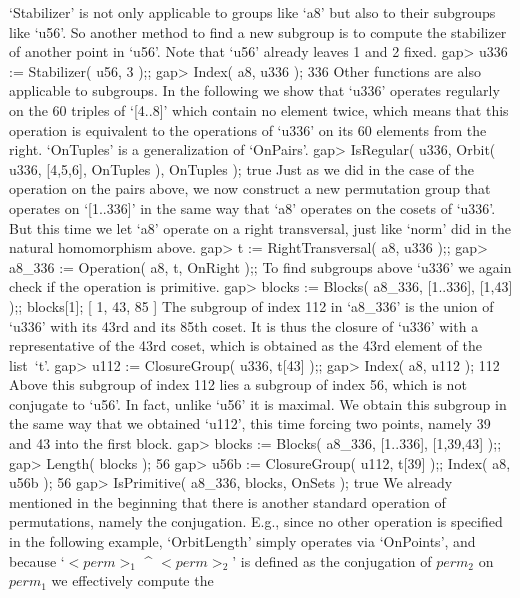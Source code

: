 `Stabilizer' is not only applicable to groups like `a8' but also to their
subgroups like  `u56'. So another  method  to find  a  new subgroup is to
compute the stabilizer of another point in `u56'. Note that `u56' already
leaves 1 and 2 fixed.
\beginexample
    gap> u336 := Stabilizer( u56, 3 );;
    gap> Index( a8, u336 );
    336 
\endexample
Other functions  are also  applicable to subgroups.  In  the following we
show that  `u336' operates regularly on the  60 triples of `[4..8]' which
contain no  element twice, which  means that this operation is equivalent
to the operations of `u336' on its 60 elements from the right. `OnTuples'
is a generalization of `OnPairs'.
\beginexample
    gap> IsRegular( u336, Orbit( u336, [4,5,6], OnTuples ), OnTuples );
    true 
\endexample
Just as we did in the  case of the  operation on the  pairs above, we now
construct a new permutation group that operates on `[1..336]' in the same
way that `a8' operates on the cosets of `u336'. But this time we let `a8'
operate  on a right   transversal, just like  `norm'  did in  the natural
homomorphism above.
\beginexample
    gap> t := RightTransversal( a8, u336 );;
    gap> a8_336 := Operation( a8, t, OnRight );;
\endexample
To find  subgroups above  `u336'  we  again  check if  the  operation  is
primitive.
\beginexample
    gap> blocks := Blocks( a8_336, [1..336], [1,43] );; blocks[1];
    [ 1, 43, 85 ]
\endexample
The subgroup of index  112 in `a8_336'  is  the union of `u336'  with its
43rd and its  85th coset.   It  is thus   the  closure of `u336' with   a
representative of the  43rd coset, which  is obtained as the 43rd element
of the list~`t'.
\beginexample
    gap> u112 := ClosureGroup( u336, t[43] );;
    gap> Index( a8, u112 );
    112 
\endexample
Above this subgroup of index 112 lies a  subgroup  of index 56, which  is
not conjugate to `u56'.  In fact, unlike `u56' it is  maximal.  We obtain
this subgroup in  the same way that we obtained `u112', this time forcing
two points, namely 39 and 43 into the first block.
\beginexample
    gap> blocks := Blocks( a8_336, [1..336], [1,39,43] );;
    gap> Length( blocks );
    56
    gap> u56b := ClosureGroup( u112, t[39] );; Index( a8, u56b );
    56
    gap> IsPrimitive( a8_336, blocks, OnSets );
    true 
\endexample
We already   mentioned in the beginning  that  there is  another standard
operation of permutations,  namely the conjugation.  E.g., since no other
operation is specified   in the following  example, `OrbitLength'  simply
operates via `OnPoints', and because `$<perm>_1$ ^ $<perm>_2$' is defined
as  the  conjugation of $perm_2$  on  $perm_1$ we effectively compute the
